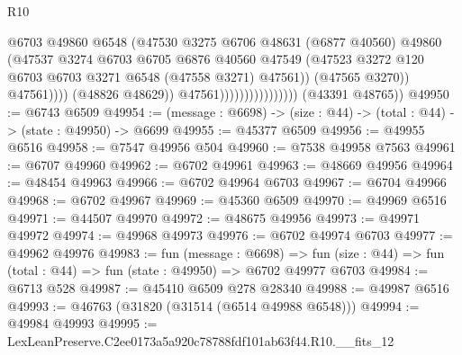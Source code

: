 \begin{lexlean}{R10}
\begin{coremodule}
                                                @6703
                                                @49860
                                                @6548
                                                (@47530
                                                  @3275
                                                  @6706
                                                  @48631
                                                  (@6877 @40560)
                                                  @49860
                                                  (@47537
                                                    @3274
                                                    @6703
                                                    @6705
                                                    @6876
                                                    @40560
                                                    @47549
                                                    (@47523
                                                      @3272
                                                      @120
                                                      @6703
                                                      @6703
                                                      @3271
                                                      @6548
                                                      (@47558 @3271)
                                                      @47561))
                                                  (@47565 @3270))
                                                @47561))))
                                        (@48826 @48629))
                                      @47561))))))))))))))))
      (@43391 @48765))
@49950 := @6743 @6509
@49954 := (message : @6698) -> (size : @44) -> (total : @44) -> (state : @49950) -> @6699
@49955 := @45377 @6509
@49956 := @49955 @6516
@49958 := @7547 @49956 @504
@49960 := @7538 @49958 @7563
@49961 := @6707 @49960
@49962 := @6702 @49961
@49963 := @48669 @49956
@49964 := @48454 @49963
@49966 := @6702 @49964 @6703
@49967 := @6704 @49966
@49968 := @6702 @49967
@49969 := @45360 @6509
@49970 := @49969 @6516
@49971 := @44507 @49970
@49972 := @48675 @49956
@49973 := @49971 @49972
@49974 := @49968 @49973
@49976 := @6702 @49974 @6703
@49977 := @49962 @49976
@49983 := fun (message : @6698) =>
  fun (size : @44) => fun (total : @44) => fun (state : @49950) => @6702 @49977 @6703
@49984 := @6713 @528
@49987 := @45410 @6509 @278 @28340
@49988 := @49987 @6516
@49993 := @46763 (@31820 (@31514 (@6514 @49988 @6548)))
@49994 := @49984 @49993
@49995 := LexLeanPreserve.C2ee0173a5a920c78788fdf101ab63f44.R10.__fits_12

\end{coremodule}
\end{lexlean}
